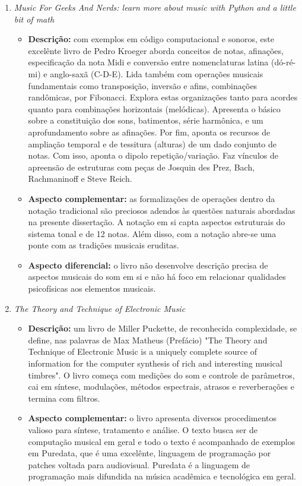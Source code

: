 \begin{enumerate}
    \item \emph{Music For Geeks And Nerds: learn more about music with Python and a little bit of math}
        \begin{itemize}
            \item {\bf Descrição:} com exemplos em código computacional e sonoros, este excelênte livro de Pedro Kroeger aborda conceitos de notas, afinações, especificação da nota Midi e conversão entre nomenclaturas latina (dó-ré-mi) e anglo-saxã (C-D-E). Lida também com operações musicais fundamentais como transposição, inversão e afins, combinações randômicas, por Fibonacci. Explora estas organizações tanto para acordes quanto para combinações horizontais (melódicas). Apresenta o básico sobre a constituição dos sons, batimentos, série harmônica, e um aprofundamento sobre as afinações. Por fim, aponta os recursos de ampliação temporal e de tessitura (alturas) de um dado conjunto de notas. Com isso, aponta o dipolo repetição/variação. Faz vínculos de apreensão de estruturas com peças de Josquin des Prez, Bach, Rachmaninoff e Steve Reich.
            \item {\bf Aspecto complementar:} as formalizações de operações dentro da notação tradicional são preciosos adendos às questões naturais abordadas na presente dissertação. A notação em si capta aspectos estruturais do sistema tonal e de 12 notas. Além disso, com a notação abre-se uma ponte com as tradições musicais eruditas.
            \item {\bf Aspecto diferencial:} o livro não desenvolve descrição precisa de aspectos musicais do som em si e não há foco em relacionar qualidades psicofísicas aos elementos musicais.
        \end{itemize}
    \item  \emph{The Theory and Technique of Electronic Music}
        \begin{itemize}
            \item {\bf Descrição:} um livro de Miller Puckette, de reconhecida complexidade, se define, nas palavras de Max Matheus (Prefácio) "The Theory and Technique of Electronic Music is a uniquely complete source of information for the computer synthesis of rich and interesting musical timbres". O livro começa com medições do som e controle de parâmetros, cai em síntese, modulações, métodos espectrais, atrasos e reverberações e termina com filtros.
            \item {\bf Aspecto complementar:} o livro apresenta diversos procedimentos valioso para síntese, tratamento e análise. O texto busca ser de computação musical em geral e todo o texto é acompanhado de exemplos em Puredata, que é uma excelênte, linguagem de programação por patches voltada para audiovisual. Puredata é a linguagem de programação mais difundida na música acadêmica e tecnológica em geral.

\end{itemize}
\end{enumerate}
